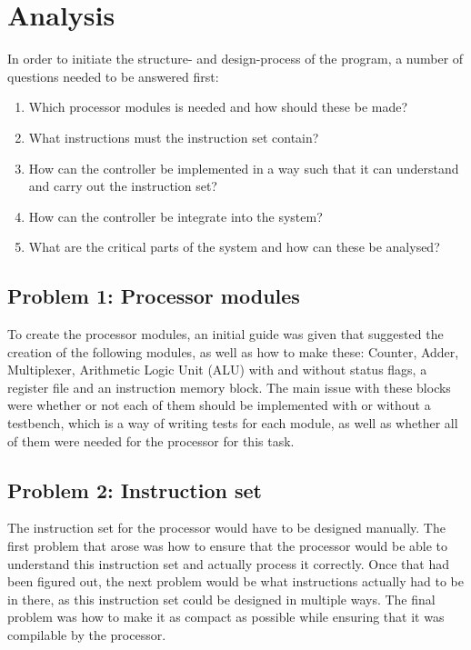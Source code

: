 \documentclass[12pt,a4paper]{article}
\begin{document}
\section{Analysis}
 	In order to initiate the structure- and design-process of the program, a number of questions needed to be answered first:\\
 	
 	\begin{enumerate}
	\item Which processor modules is needed and how should these be made?
	\item What instructions must the instruction set contain?
	\item How can the controller be implemented in a way such that it can understand and carry out the instruction set?
	\item How can the controller be integrate into the system?
	\item What are the critical parts of the system and how can these be analysed?
\end{enumerate}

\subsection{Problem 1: Processor modules}
	To create the processor modules, an initial guide was given that suggested the creation of the following modules, as well as how to make these: Counter, Adder, Multiplexer, Arithmetic Logic Unit (ALU) with and without status flags, a register file and an instruction memory block. The main issue with these blocks were whether or not each of them should be implemented with or without a testbench, which is a way of writing tests for each module, as well as whether all of them were needed for the processor for this task.\\
\subsection{Problem 2: Instruction set}
	The instruction set for the processor would have to be designed manually. The first problem that arose was how to ensure that the processor would be able to understand this instruction set and actually process it correctly. Once that had been figured out, the next problem would be what instructions actually had to be in there, as this instruction set could be designed in multiple ways. The final problem was how to make it as compact as possible while ensuring that it was compilable by the processor.\\
	
\end{document}
